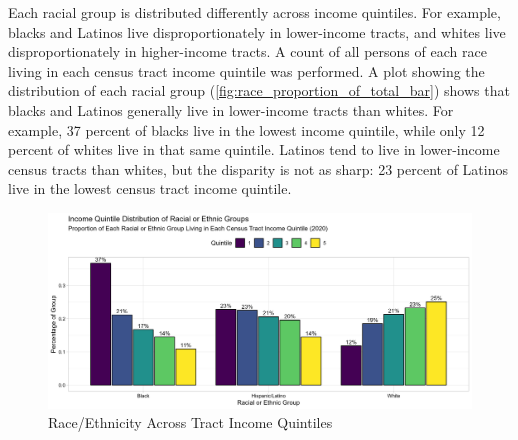 \documentclass[12pt]{article}
\begin{document}
Each racial group is distributed differently across income quintiles. For example, blacks and Latinos live disproportionately in lower-income tracts, and whites live disproportionately in higher-income tracts. A count of all persons of each race living in each census tract income quintile was performed. A plot showing the distribution of each racial group (\autoref{fig:race_proportion_of_total_bar}) shows that blacks and Latinos generally live in lower-income tracts than whites. For example, 37 percent of blacks live in the lowest income quintile, while only 12 percent of whites live in that same quintile. Latinos tend to live in lower-income census tracts than whites, but the disparity is not as sharp: 23 percent of Latinos live in the lowest census tract income quintile.

\begin{figure}[H]
  \centering
  \includegraphics[width=\linewidth]{images/total_pop_quintiles_race}
  \captionsetup{justification=centering, singlelinecheck=false, margin=2cm}
  \caption{Race/Ethnicity Across Tract Income Quintiles}
  \label{fig:total_pop_quintiles_race}
\end{figure}

\end{document}
